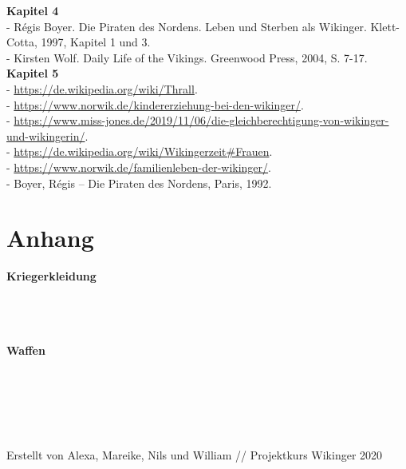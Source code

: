 \documentclass[12pt,a4paper,ngerman,openany]{book}
\newcommand\blankpage{\null \thispagestyle{empty} \addtocounter{page}{-1} \newpage}
\newcommand{\timage}[1]{\framebox{\texttt{[image: \#1]}}} %
\begin{document}
\textbf{Kapitel 4}\\
- Régis Boyer. Die Piraten des Nordens. Leben und Sterben als Wikinger. Klett-Cotta, 1997, Kapitel 1 und 3.\\
- Kirsten Wolf. Daily Life of the Vikings. Greenwood Press, 2004, S. 7-17.\\

\textbf{Kapitel 5}\\
- \url{https://de.wikipedia.org/wiki/Thrall}.\\
- \url{https://www.norwik.de/kindererziehung-bei-den-wikinger/}.\\
- \url{https://www.miss-jones.de/2019/11/06/die-gleichberechtigung-von-wikinger-und-wikingerin/}.\\
- \url{https://de.wikipedia.org/wiki/Wikingerzeit#Frauen}.\\
- \url{https://www.norwik.de/familienleben-der-wikinger/}.\\
- Boyer, Régis – Die Piraten des Nordens, Paris, 1992.\\

\afterpage{\blankpage}
\newpage
\afterpage{\blankpage}

\thispagestyle{empty}
\setlength{\fboxrule}{1pt} %
\setlength{\fboxsep}{5pt} %

\section{Anhang}

\textbf{Kriegerkleidung}\\\\
\timage{schild.jpeg} \vspace{0.5cm} \timage{tunika.jpeg} \vspace{0.5cm} \timage{hemd.jpeg}\\\\
\timage{speer.jpeg} \vspace{0.5cm} \timage{helm.jpeg}

\pagebreak

\textbf{Waffen}\\\\
\timage{bogen.jpeg} \vspace{0.5cm} \timage{breitaxt.jpeg} \vspace{0.5cm} \timage{handaxt.jpeg}\\\\
\timage{langsax.jpeg} \vspace{0.5cm} \timage{speer2.jpeg} \vspace{0.5cm} \timage{streitaxt.jpeg}\\\\
\timage{wurfaxt.jpeg} \vspace{0.5cm} \timage{suontaka.jpeg}

\newpage
\vspace*{24cm} Erstellt von Alexa, Mareike, Nils und William // Projektkurs Wikinger 2020
\thispagestyle{empty}
\newpage

\thispagestyle{empty}
\end{document}
